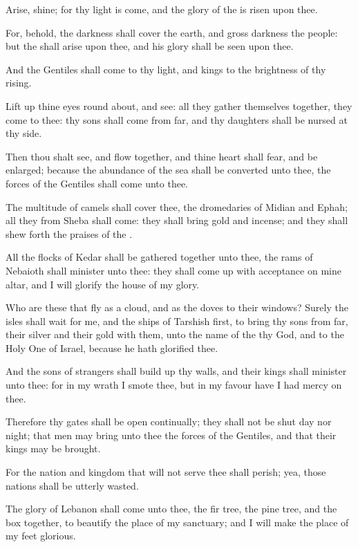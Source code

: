 \Chapter
\Verse Arise, shine; for thy light is come, and the glory of the \LORD is risen upon thee.

\Verse For, behold, the darkness shall cover the earth, and gross darkness the people: but the \LORD shall arise upon thee, and his glory shall be seen upon thee.

\Verse And the Gentiles shall come to thy light, and kings to the brightness of thy rising.

\Verse Lift up thine eyes round about, and see: all they gather themselves together, they come to thee: thy sons shall come from far, and thy daughters shall be nursed at thy side.

\Verse Then thou shalt see, and flow together, and thine heart shall fear, and be enlarged; because the abundance of the sea shall be converted unto thee, the forces of the Gentiles shall come unto thee.

\Verse The multitude of camels shall cover thee, the dromedaries of Midian and Ephah; all they from Sheba shall come: they shall bring gold and incense; and they shall shew forth the praises of the \LORD.

\Verse All the flocks of Kedar shall be gathered together unto thee, the rams of Nebaioth shall minister unto thee: they shall come up with acceptance on mine altar, and I will glorify the house of my glory.

\Verse Who are these that fly as a cloud, and as the doves to their windows?  \Verse Surely the isles shall wait for me, and the ships of Tarshish first, to bring thy sons from far, their silver and their gold with them, unto the name of the \LORD thy God, and to the Holy One of Israel, because he hath glorified thee.

\Verse And the sons of strangers shall build up thy walls, and their kings shall minister unto thee: for in my wrath I smote thee, but in my favour have I had mercy on thee.

\Verse Therefore thy gates shall be open continually; they shall not be shut day nor night; that men may bring unto thee the forces of the Gentiles, and that their kings may be brought.

\Verse For the nation and kingdom that will not serve thee shall perish; yea, those nations shall be utterly wasted.

\Verse The glory of Lebanon shall come unto thee, the fir tree, the pine tree, and the box together, to beautify the place of my sanctuary; and I will make the place of my feet glorious.

